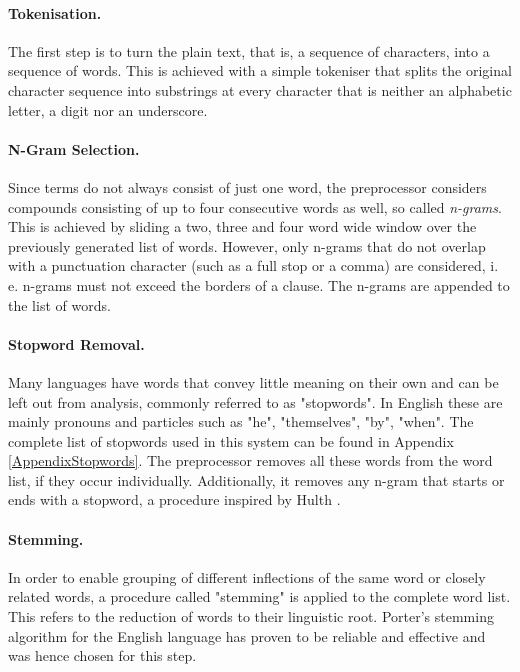 \documentclass[11pt,a4paper,twoside]{article}
\begin{document}
\paragraph{Tokenisation.} The first step is to turn the plain text, that is, a sequence of characters, into a sequence of words. This is achieved with a simple tokeniser that splits the original character sequence into substrings at every character that is neither an alphabetic letter, a digit nor an underscore. 

\paragraph{N-Gram Selection.} Since terms do not always consist of just one word, the preprocessor considers compounds consisting of up to four consecutive words as well, so called \emph{n-grams}. This is achieved by sliding a two, three and four word wide window over the previously generated list of words. However, only n-grams that do not overlap with a punctuation character (such as a full stop or a comma) are considered, i. e. n-grams must not exceed the borders of a clause. The n-grams are appended to the list of words.

\paragraph{Stopword Removal.} Many languages have words that convey little meaning on their own and can be left out from analysis, commonly referred to as "stopwords". In English these are mainly pronouns and particles such as "he", "themselves", "by", "when". The complete list of stopwords used in this system can be found in Appendix \ref{AppendixStopwords}. The preprocessor removes all these words from the word list, if they occur individually. Additionally, it removes any n-gram that starts or ends with a stopword, a procedure inspired by Hulth \cite{Hulth2003ImprovedKnowledge}.

\paragraph{Stemming.} In order to enable grouping of different inflections of the same word or closely related words, a procedure called "stemming" is applied to the complete word list. This refers to the reduction of words to their linguistic root. Porter's stemming algorithm \cite{Porter1980AnStripping} for the English language has proven to be reliable and effective and was hence chosen for this step.
\end{document}
